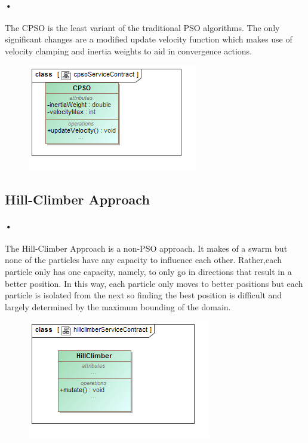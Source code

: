 \documentclass[11pt]{article}
\begin{document}
\paragraph{•}
The CPSO is the least variant of the traditional PSO algorithms. The only significant changes are a modified update velocity function which makes use of velocity clamping and inertia weights to aid in convergence actions.
\begin{figure}[h]
	\includegraphics[scale=0.80]{cpsoServiceContract.png}
\end{figure}

\subsection{Hill-Climber Approach}
\paragraph{•}
The Hill-Climber Approach is a non-PSO approach. It makes of a swarm but none of the particles have any capacity to influence each other. Rather,each particle only has one capacity, namely, to only go in directions that result in a better position. In this way, each particle only moves to better positions but each particle is isolated from the next so finding the best position is difficult and largely determined by the maximum bounding of the domain.
\begin{figure}[h]
	\includegraphics[scale=0.80]{hillclimberServiceContract.png}
\end{figure}
\end{document}
